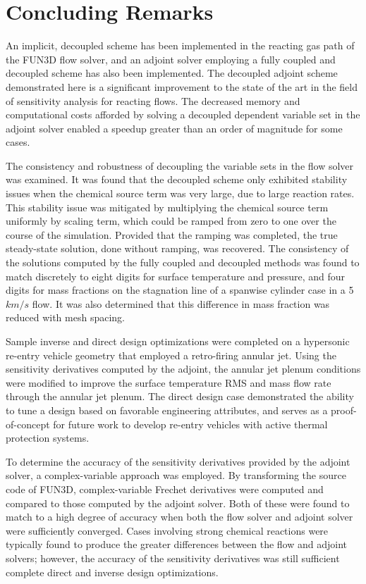 \chapter{Concluding Remarks}
\label{chapter-ten}

An implicit, decoupled scheme has been implemented in the reacting gas path of
the FUN3D flow solver, and an adjoint solver employing a fully coupled and
decoupled scheme has also been implemented.  The decoupled adjoint scheme
demonstrated here is a significant improvement to the state of the art in the
field of sensitivity analysis for reacting flows.  The decreased memory and
computational costs afforded by solving a decoupled dependent variable set in
the adjoint solver enabled a speedup greater than an order of magnitude for some
cases.  

The consistency and robustness of decoupling the variable sets in the flow
solver was examined.  It was found that the decoupled scheme only exhibited
stability issues when the chemical source term was very large, due to large
reaction rates.  This stability issue was mitigated by multiplying the chemical
source term uniformly by scaling term, which could be ramped from zero to one
over the course of the simulation.  Provided that the ramping was completed, the
true steady-state solution, done without ramping, was recovered.  The
consistency of the solutions computed by the fully coupled and decoupled methods
was found to match discretely to eight digits for surface temperature and pressure,
and four digits for mass fractions on the stagnation line of a spanwise
cylinder case in a 5 $km/s$ flow.  It was also determined that this difference
in mass fraction was reduced with mesh spacing.

Sample inverse and direct design optimizations were completed on a hypersonic
re-entry vehicle geometry that employed a retro-firing annular jet.  Using the
sensitivity derivatives computed by the adjoint, the annular jet plenum
conditions were modified to improve the surface temperature RMS and mass flow
rate through the annular jet plenum.  The direct design case demonstrated the
ability to tune a design based on favorable engineering attributes, and serves
as a proof-of-concept for future work to develop re-entry vehicles with active
thermal protection systems.

To determine the accuracy of the sensitivity derivatives provided by the adjoint
solver, a complex-variable approach was employed.  By transforming the source
code of FUN3D, complex-variable Frechet derivatives were computed and compared
to those computed by the adjoint solver.  Both of these were found to match to a
high degree of accuracy when both the flow solver and adjoint solver were
sufficiently converged.  Cases involving strong chemical reactions were
typically found to produce the greater differences between the flow and adjoint
solvers; however, the accuracy of the sensitivity derivatives was still
sufficient complete direct and inverse design optimizations.

